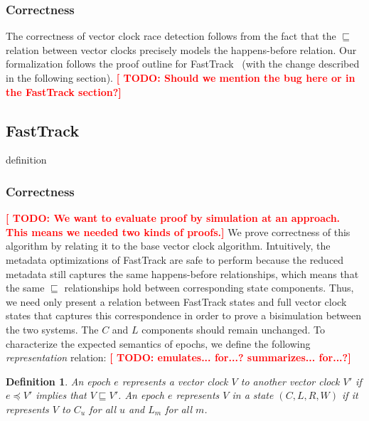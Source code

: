 \documentclass[preprint, 10pt]{sigplanconf}
\newcommand{\TODO}[1]{\textbf{\textcolor{red}{[ TODO: #1]}}}
\newtheorem{definition}{Definition}
\begin{document}
\subsubsection{Correctness}
The correctness of vector clock race detection follows from the fact that the $\sqsubseteq$ relation between vector clocks precisely models the happens-before relation. Our formalization follows the proof outline for FastTrack~\cite{fasttrack} (with the change described in the following section). \TODO{Should we mention the bug here or in the FastTrack section?}

\subsection{FastTrack}
definition

\subsubsection{Correctness}
\TODO{We want to evaluate proof by simulation at an approach. This means we needed two kinds of proofs.} We prove correctness of this algorithm by relating it to the base vector clock algorithm. Intuitively, the metadata optimizations of FastTrack are safe to perform because the reduced metadata still captures the same happens-before relationships, which means that the same $\sqsubseteq$ relationships hold between corresponding state components. Thus, we need only present a relation between FastTrack states and full vector clock states that captures this correspondence in order to prove a bisimulation between the two systems. The $C$ and $L$ components should remain unchanged. To characterize the expected semantics of epochs, we define the following \emph{representation} relation: \TODO{emulates... for...? summarizes... for...?}
\begin{definition}An epoch $e$ \emph{represents} a vector clock $V$ to another vector clock $V'$ if $e \preceq V'$ implies that $V \sqsubseteq V'$. An epoch $e$ represents $V$ in a state $(C, L, R, W)$ if it represents $V$ to $C_u$ for all $u$ and $L_m$ for all $m$.\end{definition}
\end{document}
